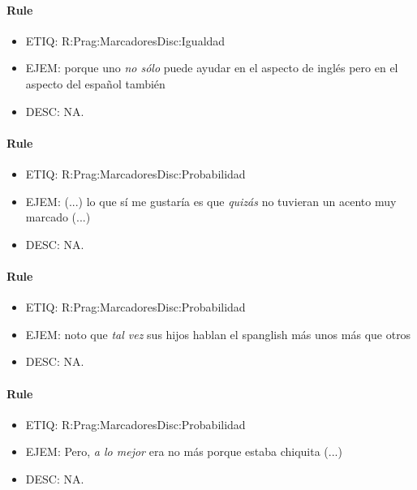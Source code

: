 \documentclass[11pt]{report}
\begin{document}
\paragraph*{Rule}
\begin{itemize}
\item ETIQ: R:Prag:MarcadoresDisc:Igualdad
\item EJEM: porque uno \emph{no sólo} puede ayudar en el aspecto de inglés pero en el aspecto del español también
\item DESC: NA.
\end{itemize}

\paragraph*{Rule}
\begin{itemize}
\item ETIQ: R:Prag:MarcadoresDisc:Probabilidad
\item EJEM: (...) lo que sí me gustaría es que \emph{quizás} no tuvieran un acento muy marcado (...)
\item DESC: NA.
\end{itemize}

\paragraph*{Rule}
\begin{itemize}
\item ETIQ: R:Prag:MarcadoresDisc:Probabilidad
\item EJEM: noto que \emph{tal vez} sus hijos hablan el spanglish más unos más que otros
\item DESC: NA.
\end{itemize}

\paragraph*{Rule}
\begin{itemize}
\item ETIQ: R:Prag:MarcadoresDisc:Probabilidad
\item EJEM: Pero, \emph{a lo mejor} era no más porque estaba chiquita (...)
\item DESC: NA.
\end{itemize}
\end{document}
